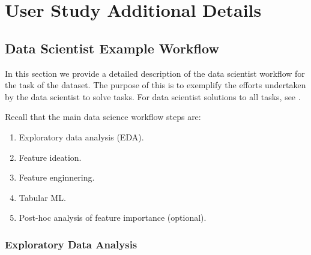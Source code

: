 \section{User Study Additional Details}\label{app: user study}


\subsection{Data Scientist Example Workflow}

In this section we provide a detailed description of the data scientist workflow for the \userChurn task of the \handm dataset. The purpose of this is to exemplify the efforts undertaken by the data scientist to solve \relbench tasks. For data scientist solutions to all tasks, see \userstudy.

Recall that the main data science workflow steps are:
%
\begin{enumerate}
    \item Exploratory data analysis (EDA).
    \item Feature ideation.
    \item Feature enginnering. 
    \item Tabular ML.
    \item Post-hoc analysis of feature importance (optional).
\end{enumerate}



\subsubsection{Exploratory Data Analysis}

